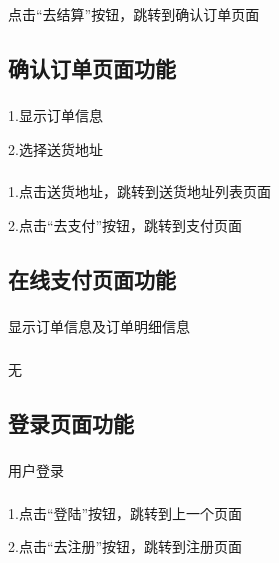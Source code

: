 \subsubsection*{}
点击“去结算”按钮，跳转到确认订单页面~\\

\subsection{确认订单页面功能}
\subsubsection*{}
1.显示订单信息

2.选择送货地址
\subsubsection*{}
1.点击送货地址，跳转到送货地址列表页面

2.点击“去支付”按钮，跳转到支付页面~\\

\subsection{在线支付页面功能}
\subsubsection*{}
显示订单信息及订单明细信息
\subsubsection*{}
无~\\

\subsection{登录页面功能}
\subsubsection*{}
用户登录
\subsubsection*{}
1.点击“登陆”按钮，跳转到上一个页面

2.点击“去注册”按钮，跳转到注册页面~\\

